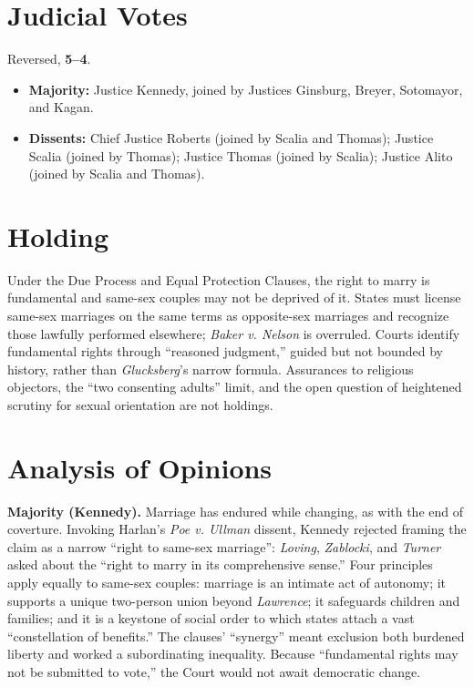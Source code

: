 \documentclass[12pt]{article}
\begin{document}
\section{Judicial Votes}

Reversed, \textbf{5--4}.
\begin{itemize}
\item \textbf{Majority:} Justice Kennedy, joined by Justices Ginsburg, Breyer, Sotomayor, and Kagan.
\item \textbf{Dissents:} Chief Justice Roberts (joined by Scalia and Thomas); Justice Scalia (joined by Thomas); Justice Thomas (joined by Scalia); Justice Alito (joined by Scalia and Thomas).
\end{itemize}

\section{Holding}

Under the Due Process and Equal Protection Clauses, the right to marry is fundamental and same-sex couples may not be deprived of it. States must license same-sex marriages on the same terms as opposite-sex marriages and recognize those lawfully performed elsewhere; \textit{Baker v. Nelson} is overruled. Courts identify fundamental rights through ``reasoned judgment,'' guided but not bounded by history, rather than \textit{Glucksberg}'s narrow formula. Assurances to religious objectors, the ``two consenting adults'' limit, and the open question of heightened scrutiny for sexual orientation are not holdings.

\section{Analysis of Opinions}

\textbf{Majority (Kennedy).} Marriage has endured while changing, as with the end of coverture. Invoking Harlan's \textit{Poe v. Ullman} dissent, Kennedy rejected framing the claim as a narrow ``right to same-sex marriage'': \textit{Loving}, \textit{Zablocki}, and \textit{Turner} asked about the ``right to marry in its comprehensive sense.'' Four principles apply equally to same-sex couples: marriage is an intimate act of autonomy; it supports a unique two-person union beyond \textit{Lawrence}; it safeguards children and families; and it is a keystone of social order to which states attach a vast ``constellation of benefits.'' The clauses' ``synergy'' meant exclusion both burdened liberty and worked a subordinating inequality. Because ``fundamental rights may not be submitted to vote,'' the Court would not await democratic change.
\end{document}
